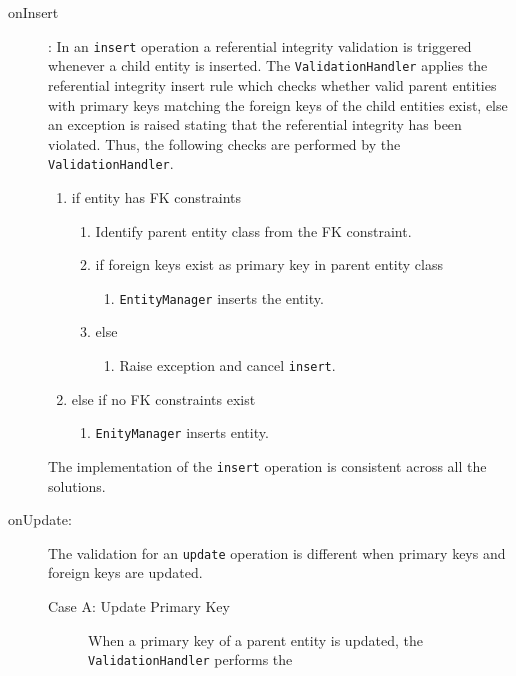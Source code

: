 		\begin{description}
		\item[onInsert]: 
		In an \texttt{insert} operation a referential
		integrity validation is triggered whenever a child entity is  inserted. 
		The \texttt{ValidationHandler} applies the referential integrity insert
		rule which checks whether  valid parent entities with
		primary keys matching the foreign keys of the child entities exist, else an
		exception is raised stating that the referential integrity has been violated.
		Thus, the following checks are performed by the \texttt{ValidationHandler}.
		\renewcommand{\labelenumii}{\arabic{enumi}.\arabic{enumii}}
		\renewcommand{\labelenumiii}{\arabic{enumi}.\arabic{enumii}.\arabic{enumiii}}
		
		\begin{enumerate}
		\item if entity has \ac{FK} constraints
				\begin{enumerate}
				\item Identify parent entity class from the \ac{FK} constraint.
				\item if foreign keys exist as  primary key in  parent entity class
				  		\begin{enumerate}
				  		\item \texttt{EntityManager} inserts the entity.
				  		\end{enumerate}
				\item else
				   		\begin{enumerate}
				   		  \item Raise exception and cancel \texttt{insert}.
				   		\end{enumerate}
				\end{enumerate}   	
		\item else if no \ac{FK} constraints exist
		  		\begin{enumerate}
		  		\item \texttt{EnityManager} inserts entity.
		  		\end{enumerate}
		\end{enumerate}
		The implementation of the \texttt{insert} operation is consistent across all the
		solutions. 
		\item[onUpdate:] The validation for an \texttt{update} operation is different
		when primary keys and foreign keys are updated. 
		\begin{description}
		\item[Case A: Update Primary Key] When a  primary key of a
		parent entity is updated, the \texttt{ValidationHandler} performs the

\end{description}
\end{description}
